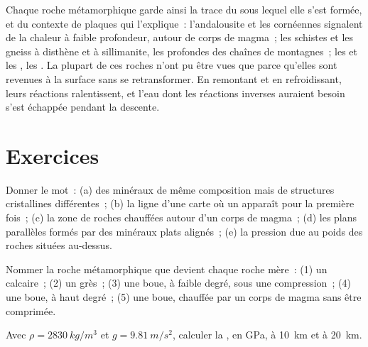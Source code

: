 Chaque roche métamorphique garde ainsi la trace du  sous lequel
elle s'est formée, et du contexte de plaques qui l'explique~: l'andalousite
et les cornéennes signalent de la chaleur à faible profondeur, autour de
corps de magma~; les schistes et les gneiss à disthène et à sillimanite, les
 profondes des chaînes de montagnes~; les  et les
, les . La plupart de ces roches n'ont pu être
vues que parce qu'elles sont revenues à la surface sans se retransformer.
En remontant et en refroidissant, leurs réactions ralentissent, et l'eau
dont les réactions inverses auraient besoin s'est échappée pendant la
descente.

\section{Exercices}

\begin{exercise}[$\star$]\label{exo:g12:metamorphic-rocks:1}
Donner le mot~: (a) des minéraux de même composition mais de structures
cristallines différentes~; (b) la ligne d'une carte où un 
apparaît pour la première fois~; (c) la zone de roches chauffées autour
d'un corps de magma~; (d) les plans parallèles formés par des minéraux
plats alignés~; (e) la pression due au poids des roches situées au-dessus.
\end{exercise}

\begin{exercise}[$\star$]\label{exo:g12:metamorphic-rocks:2}
Nommer la roche métamorphique que devient chaque roche mère~: (1) un
calcaire~; (2) un grès~; (3) une boue, à faible degré, sous une
compression~; (4) une boue, à haut degré~; (5) une boue, chauffée par un
corps de magma sans être comprimée.
\end{exercise}

\begin{exercise}[$\star$]\label{exo:g12:metamorphic-rocks:3}
Avec $\rho = \qty{2830}{kg/m^3}$ et $g = \qty{9.81}{m/s^2}$, calculer la
, en \unit{GPa}, à \qty{10}{km} et à \qty{20}{km}.
\end{exercise}

